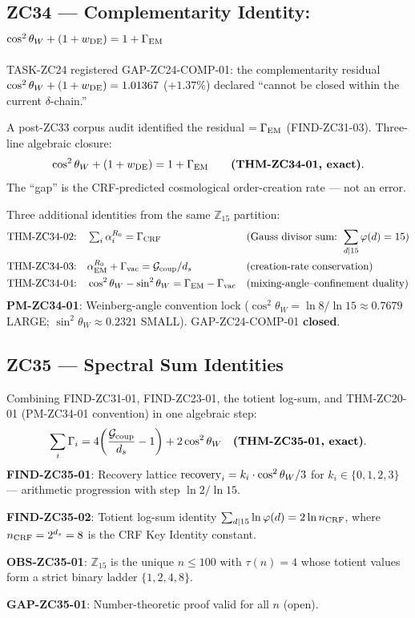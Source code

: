 \documentclass[11pt, a4paper]{article}
\newcommand{\swsq}{\sin^2\theta_W}
\newcommand{\cwsq}{\cos^2\theta_W}
\newcommand{\Zft}{\mathbb{Z}_{15}}  %
\newcommand{\Gcoup}{\mathcal{G}_{\rm coup}}
\begin{document}
\subsection{ZC34 --- Complementarity Identity: $\cwsq + (1+w_{\rm DE}) = 1 + \Gamma_{\rm EM}$}

\begin{zcbox}[title={ZC34: THM-ZC34-01 --- GAP-ZC24-COMP-01 Closed; PM-ZC34-01}]
\sloppy
TASK-ZC24 registered GAP-ZC24-COMP-01: the complementarity residual
$\cwsq + (1+w_{\rm DE}) = 1.01367$ ($+1.37\%$) declared ``cannot be
closed within the current $\delta$-chain.''

A post-ZC33 corpus audit identified the residual $= \Gamma_{\rm EM}$
(FIND-ZC31-03). Three-line algebraic closure:
\[
  \cwsq + (1+w_{\rm DE}) = 1 + \Gamma_{\rm EM}
  \qquad \textbf{(THM-ZC34-01, exact)}.
\]
The ``gap'' is the CRF-predicted cosmological order-creation rate ---
not an error.

Three additional identities from the same $\Zft$ partition:
\begin{align*}
  \text{THM-ZC34-02:}\quad & \textstyle\sum_i\alpha_i^{R_0} = \Gamma_{\rm CRF}
    && (\text{Gauss divisor sum: }\sum_{d|15}\varphi(d)=15)\\
  \text{THM-ZC34-03:}\quad & \alpha_{\rm EM}^{R_0} + \Gamma_{\rm vac} = \Gcoup/d_s
    && (\text{creation-rate conservation})\\
  \text{THM-ZC34-04:}\quad & \cwsq - \swsq = \Gamma_{\rm EM} - \Gamma_{\rm vac}
    && (\text{mixing-angle--confinement duality})
\end{align*}
\textbf{PM-ZC34-01}: Weinberg-angle convention lock ($\cwsq = \ln 8/\ln 15
\approx 0.7679$ LARGE; $\swsq \approx 0.2321$ SMALL).
GAP-ZC24-COMP-01 \textbf{closed}.
\end{zcbox}

\subsection{ZC35 --- Spectral Sum Identities}

\begin{zcbox}[title={ZC35: THM-ZC35-01 --- Spectral Sum; OBS-ZC35-01; GAP-ZC35-01}]
\sloppy
Combining FIND-ZC31-01, FIND-ZC23-01, the totient log-sum, and
THM-ZC20-01 (PM-ZC34-01 convention) in one algebraic step:
\[
  \sum_i \Gamma_i = 4\!\left(\frac{\Gcoup}{d_s} - 1\right) + 2\cwsq
  \quad \textbf{(THM-ZC35-01, exact)}.
\]
\textbf{FIND-ZC35-01}: Recovery lattice
${\rm recovery}_i = k_i\cdot\cwsq/3$ for $k_i\in\{0,1,2,3\}$ ---
arithmetic progression with step $\ln 2/\ln 15$.

\textbf{FIND-ZC35-02}: Totient log-sum identity
$\sum_{d|15}\ln\varphi(d) = 2\ln n_{\rm CRF}$, where $n_{\rm CRF}
= 2^{d_s} = 8$ is the CRF Key Identity constant.

\textbf{OBS-ZC35-01}: $\Zft$ is the unique $n\le 100$ with $\tau(n)=4$
whose totient values form a strict binary ladder $\{1,2,4,8\}$.

\textbf{GAP-ZC35-01}: Number-theoretic proof valid for all $n$ (open).
\end{zcbox}
\end{document}
